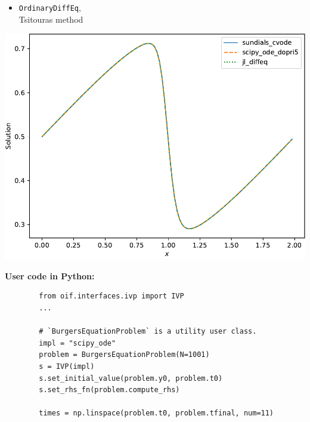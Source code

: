 \documentclass[a0paper, twocolumn, csc, english, final]{mpi2015_poster}
\begin{document}
\begin{poster}
\begin{pcolumn}
\begin{pbox}
\begin{minipage}{\dimexpr0.46\columnwidth - 2\tabcolsep}
\begin{itemize}
          \item \texttt{OrdinaryDiffEq},\\Tsitouras method
        \end{itemize}
      \end{minipage}\hfill%
      \begin{minipage}{\dimexpr0.54\columnwidth - 2\tabcolsep}
        \includegraphics[width=\linewidth]{ivp_c_burgers_eq}
      \end{minipage}

      \vspace{2em}
      \textbf{User code in Python:}
      \begin{verbatim}
        from oif.interfaces.ivp import IVP
        ...

        # `BurgersEquationProblem` is a utility user class.
        impl = "scipy_ode"
        problem = BurgersEquationProblem(N=1001)
        s = IVP(impl)
        s.set_initial_value(problem.y0, problem.t0)
        s.set_rhs_fn(problem.compute_rhs)

        times = np.linspace(problem.t0, problem.tfinal, num=11)


\end{verbatim}
\end{pbox}
\end{pcolumn}
\end{poster}
\end{document}
